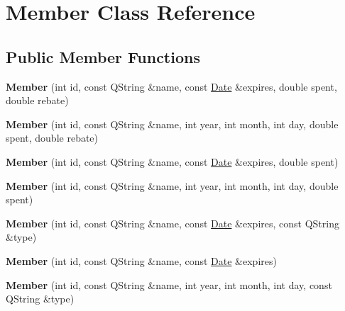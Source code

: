 \hypertarget{class_member}{}\section{Member Class Reference}
\label{class_member}
\subsection*{Public Member Functions}
\begin{DoxyCompactItemize}
\item 
{\bfseries Member} (int id, const Q\+String \&name, const \hyperlink{class_date}{Date} \&expires, double spent, double rebate)\hypertarget{class_member_aaa99f7b32baa30bb508f90780fad3686}{}\label{class_member_aaa99f7b32baa30bb508f90780fad3686}

\item 
{\bfseries Member} (int id, const Q\+String \&name, int year, int month, int day, double spent, double rebate)\hypertarget{class_member_acc2ee89d7d3084f8c4369d62171f9cf1}{}\label{class_member_acc2ee89d7d3084f8c4369d62171f9cf1}

\item 
{\bfseries Member} (int id, const Q\+String \&name, const \hyperlink{class_date}{Date} \&expires, double spent)\hypertarget{class_member_a9b7477654c7665f5a8fe4a1c77a24ad7}{}\label{class_member_a9b7477654c7665f5a8fe4a1c77a24ad7}

\item 
{\bfseries Member} (int id, const Q\+String \&name, int year, int month, int day, double spent)\hypertarget{class_member_af85f6f71399887d79948587090ce72dd}{}\label{class_member_af85f6f71399887d79948587090ce72dd}

\item 
{\bfseries Member} (int id, const Q\+String \&name, const \hyperlink{class_date}{Date} \&expires, const Q\+String \&type)\hypertarget{class_member_a503115da322b4b446aacf3f8dc1967be}{}\label{class_member_a503115da322b4b446aacf3f8dc1967be}

\item 
{\bfseries Member} (int id, const Q\+String \&name, const \hyperlink{class_date}{Date} \&expires)\hypertarget{class_member_a010063e68112948373f15032d5679f0f}{}\label{class_member_a010063e68112948373f15032d5679f0f}

\item 
{\bfseries Member} (int id, const Q\+String \&name, int year, int month, int day, const Q\+String \&type)\hypertarget{class_member_a3c3599e3c653e3e8bb3eb7881fe48278}{}\label{class_member_a3c3599e3c653e3e8bb3eb7881fe48278}


\end{DoxyCompactItemize}
